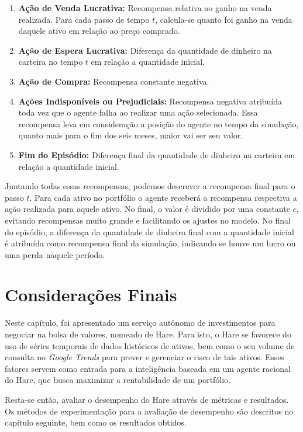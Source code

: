 \begin{itemize}
        \begin{enumerate}
            \item \textbf{Ação de Venda Lucrativa:} Recompensa relativa ao ganho na venda realizada. Para cada passo de tempo $t$, calcula-se quanto foi ganho na venda daquele ativo em relação ao preço comprado.
            \item \textbf{Ação de Espera Lucrativa:} Diferença da quantidade de dinheiro na carteira no tempo $t$ em relação a quantidade inicial.
            \item \textbf{Ação de Compra:} Recompensa constante negativa.
            \item \textbf{Ações Indisponíveis ou Prejudiciais:} Recompensa negativa atribuída toda vez que o agente falha ao realizar uma ação selecionada. Essa recompensa leva em consideração a posição do agente no tempo da simulação, quanto mais para o fim dos seis meses, maior vai ser seu valor.
            \item \textbf{Fim do Episódio:} Diferença final da quantidade de dinheiro na carteira em relação a quantidade inicial.
        \end{enumerate}
    
    Juntando todas essas recompensas, podemos descrever a recompensa final para o passo $t$. Para cada ativo no portfólio o agente receberá a recompensa respectiva a ação realizada para aquele ativo. No final, o valor é dividido por uma constante $c$, evitando recompensas muito grande e facilitando os ajustes no modelo. No final do episódio, a diferença da quantidade de dinheiro final com a quantidade inicial é atribuída como recompensa final da simulação, indicando se houve um lucro ou uma perda naquele período.
    
\end{itemize}


\section{Considerações Finais}


Neste capítulo, foi apresentado um serviço autônomo de investimentos para negociar na bolsa de valores, nomeado de Hare. Para isto, o Hare se favorece do uso de séries temporais de dados históricos de ativos, bem como o seu volume de consulta no \textit{Google Trends} para prever e gerenciar o risco de tais ativos. Esses fatores servem como entrada para a inteligência baseada em um agente racional do Hare, que busca maximizar a rentabilidade de um portfólio.

Resta-se então, avaliar o desempenho do Hare através de métricas e resultados. Os métodos de experimentação para a avaliação de desempenho são descritos no capítulo seguinte, bem como os resultados obtidos.

